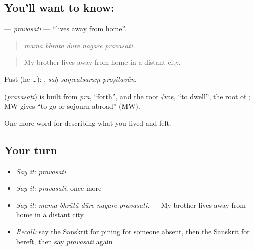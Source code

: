 \subsection*{You'll want to know: }
\textbf{} — \emph{pravasati} — \textquotedblleft{}lives away from home\textquotedblright{}.

\begin{quote}
    
\end{quote}

\begin{quote}
\emph{mama bhrātā dūre nagare pravasati.}
\end{quote}

\begin{quote}
My brother lives away from home in a distant city.
\end{quote}

Past (he …):   , \emph{saḥ saṃvatsaraṃ proṣitavān}.

\begin{cousinweb}
\textbf{} (\emph{pravasati}) is built from \emph{pra}, \textquotedblleft{}forth\textquotedblright{}, and the root √vas, \textquotedblleft{}to dwell\textquotedblright{}, the root of \textbf{}; MW gives \textquotedblleft{}to go or sojourn abroad\textquotedblright{} (MW).
\end{cousinweb}

\begin{grammarlens}[title={What you've built}]
One more word for describing what you lived and felt.
\end{grammarlens}

\subsection*{Your turn}
\begin{itemize}
\raggedright
  \item \emph{Say it:} \emph{pravasati}
  \item \emph{Say it:} \emph{pravasati}, once more
  \item \emph{Say it:} \emph{mama bhrātā dūre nagare pravasati.} — My brother lives away from home in a distant city.
  \item \emph{Recall:} say the Sanskrit for pining for someone absent, then the Sanskrit for bereft, then say \emph{pravasati} again
\end{itemize}

